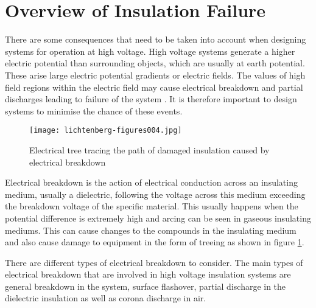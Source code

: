 \section{Overview of Insulation Failure}
There are some consequences that need to be taken into account when designing systems for operation at high voltage. 
High voltage systems generate a higher electric potential than surrounding objects, which are usually at earth potential. 
These arise large electric potential gradients or electric fields. 
The values of high field regions within the electric field may cause electrical breakdown and partial discharges leading to failure of the system \citep{kuffel2000high}. 
It is therefore important to design systems to minimise the chance of these events.

\begin{figure}[!h]
   \centering
   \texttt{[image: lichtenberg-figures004.jpg]}
   \caption{Electrical tree tracing the path of damaged insulation caused by electrical breakdown \cite{tree}}
   \label{figure:breakdown}
\end{figure}

Electrical breakdown is the action of electrical conduction across an insulating medium, usually a dielectric, following the voltage across this medium exceeding the breakdown voltage of the specific material. 
This usually happens when the potential difference is extremely high and arcing can be seen in gaseous insulating mediums. 
This can cause changes to the compounds in the insulating medium and also cause damage to equipment in the form of treeing as shown in figure \ref{figure:breakdown}. 

There are different types of electrical breakdown to consider. 
The main types of electrical breakdown that are involved in high voltage insulation systems are general breakdown in the system, surface flashover, partial discharge in the dielectric insulation as well as corona discharge in air.

